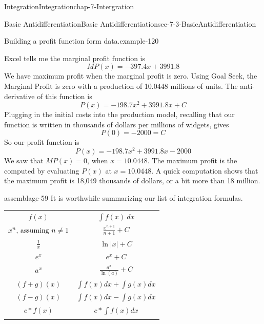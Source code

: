 \documentclass[oneside,10pt,]{book}
\numberwithin{equation}{section}
\newcommand{\hrulethin}  {\noalign{\hrule height 0.04em}}
\newcommand{\hrulemedium}{\noalign{\hrule height 0.07em}}
\newcommand{\hrulethick} {\noalign{\hrule height 0.11em}}
\begin{document}
\begin{chapterptx}{Integration}{}{Integration}{}{}{chap-7-Intergration}
\begin{sectionptx}{Basic Antidifferentiation}{}{Basic Antidifferentiation}{}{}{sec-7-3-BasicAntidifferentiation}
\begin{example}{Building a profit function form data.}{example-120}
\begin{sidebyside}{1}{0.1}{0.1}{0}
\begin{sbspanel}{0.8}
\end{sbspanel}%
\end{sidebyside}%
\par
\hypertarget{p-2782}{}%
Excel tells me the marginal profit function is%
%
\begin{equation*}
MP(x) = -397.4 x + 3991.8
\end{equation*}
\hypertarget{p-2783}{}%
We have maximum profit when the marginal profit is zero.  Using Goal Seek, the Marginal Profit is zero with a production of 10.0448 millions of units.  The anti-derivative of this function is%
%
\begin{equation*}
P(x)= -198.7 x^2  + 3991.8x + C
\end{equation*}
\hypertarget{p-2784}{}%
Plugging in the initial costs into the production model, recalling that our function is written in thousands of dollars per millions of widgets, gives%
%
\begin{equation*}
P(0) = -2000 = C
\end{equation*}
\hypertarget{p-2785}{}%
So our profit function is%
%
\begin{equation*}
P(x)= -198.7 x^2  + 3991.8 x-2000
\end{equation*}
\hypertarget{p-2786}{}%
We saw that \(MP(x) = 0\), when \(x = 10.0448\). The maximum profit is the computed by evaluating \(P(x)\) at \(x = 10.0448\). A quick computation shows that the  maximum profit is \textdollar{}18,049 thousands of dollars, or a bit more than \textdollar{}18 million.%
\end{example}
\begin{assemblage}{}{assemblage-59}%
\hypertarget{p-2787}{}%
It is worthwhile summarizing our list of integration formulas.%
\begin{sidebyside}{1}{0}{0}{0}%
\begin{sbspanel}{1}%
{\centering%
\begin{tabular}{cc}\hrulethick
\(f(x)\)&\(\int f(x)\ dx\)\tabularnewline\hrulethin
\(\displaystyle x^n\hbox{, assuming }n\ne 1\)&\(\displaystyle \frac{x^{n+1}}{n+1}+C\)\tabularnewline\hrulemedium
\(\displaystyle \frac{1}{x}\)&\(\displaystyle \ln|x|+C\)\tabularnewline\hrulemedium
\(\displaystyle e^x\)&\(\displaystyle e^x+C\)\tabularnewline\hrulemedium
\(\displaystyle a^x\)&\(\displaystyle \frac{a^x}{\ln(a)}+C\)\tabularnewline\hrulemedium
\(\displaystyle (f+g)(x)\)&\(\displaystyle \int f(x)dx+\int g(x)dx\)\tabularnewline\hrulemedium
\(\displaystyle (f-g)(x)\)&\(\displaystyle \int f(x)dx-\int g(x)dx\)\tabularnewline\hrulemedium
\(\displaystyle c*f(x)\)&\(\displaystyle c*\int f(x)dx\)\tabularnewline\hrulemedium

\end{tabular}}
\end{sbspanel}
\end{sidebyside}
\end{assemblage}
\end{sectionptx}
\end{chapterptx}
\end{document}
